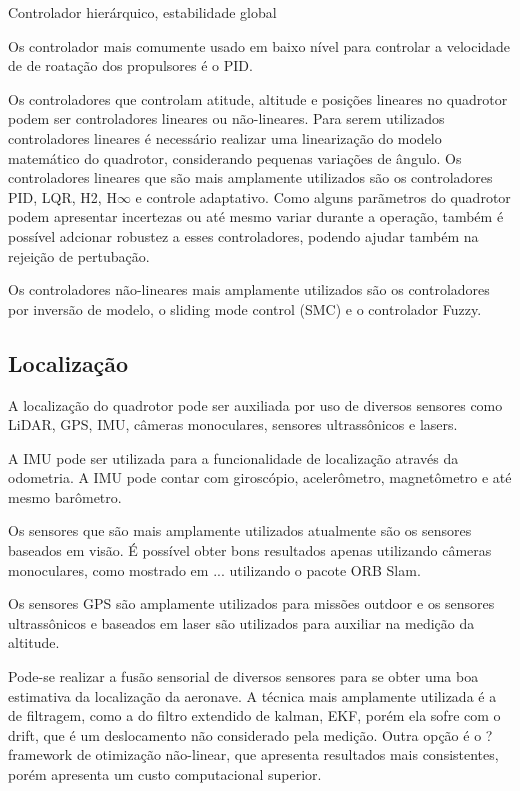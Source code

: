Controlador hierárquico, estabilidade global

Os controlador mais comumente usado em baixo nível para controlar a velocidade de de roatação dos propulsores é o PID. 

Os controladores que controlam atitude, altitude e posições lineares no quadrotor podem ser controladores lineares ou não-lineares. Para serem utilizados controladores lineares é necessário realizar uma linearização do modelo matemático do quadrotor, considerando pequenas variações de ângulo. Os controladores lineares que são mais amplamente utilizados são os controladores PID, LQR, H2, H$\infty$ e controle adaptativo. Como alguns parãmetros do quadrotor podem apresentar incertezas ou até mesmo variar durante a operação, também é possível adcionar robustez a esses controladores, podendo ajudar também na rejeição de pertubação.

Os controladores não-lineares mais amplamente utilizados são os controladores por inversão de modelo, o sliding mode control (SMC) e o controlador Fuzzy.

\subsection{Localização}
A localização do quadrotor pode ser auxiliada por uso de diversos sensores como LiDAR, GPS, IMU, câmeras monoculares, sensores ultrassônicos e lasers.

A IMU pode ser utilizada para a funcionalidade de localização através da odometria. A IMU pode contar com giroscópio, acelerômetro, magnetômetro e até mesmo barômetro.

Os sensores que são mais amplamente utilizados atualmente são os sensores baseados em visão. É possível obter bons resultados apenas utilizando câmeras monoculares, como mostrado em ... utilizando o pacote ORB Slam.

Os sensores GPS são amplamente utilizados para missões outdoor e os sensores ultrassônicos e baseados em laser são utilizados para auxiliar na medição da altitude.

Pode-se realizar a fusão sensorial de diversos sensores para se obter uma boa estimativa da localização da aeronave. A técnica mais amplamente utilizada é a de filtragem, como a do filtro extendido de kalman, EKF, porém ela sofre com o drift, que é um deslocamento não considerado pela medição. Outra opção é o ? framework de otimização não-linear, que apresenta resultados mais consistentes, porém apresenta um custo computacional superior.

